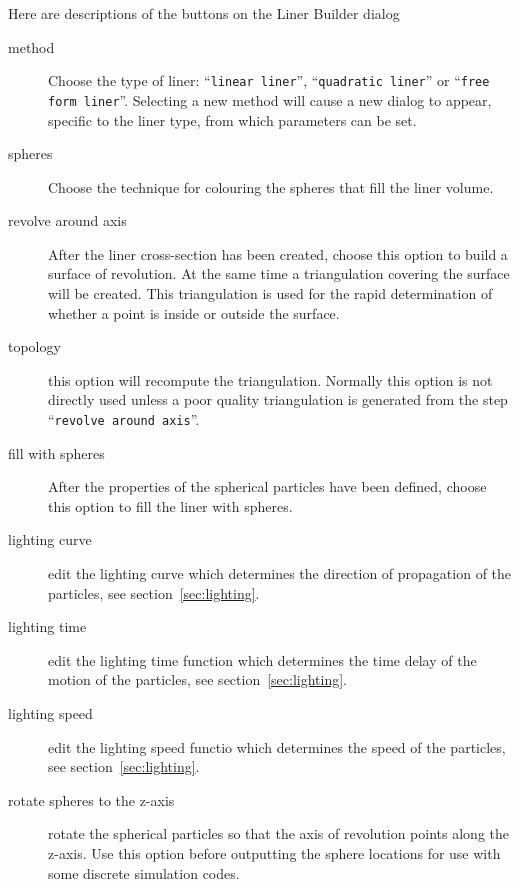 \documentclass[12pt]{article}
\newcommand{\cmd}[1]{``{\tt #1}''}
\begin{document}
Here are descriptions of the buttons on the Liner Builder dialog
\begin{description}
  \item[method] Choose the type of liner: \cmd{linear liner}, \cmd{quadratic liner} or \cmd{free form liner}.
     Selecting a new method will cause a new dialog to appear, specific to the liner type,
     from which parameters can be set.
  \item[spheres] Choose the technique for colouring the spheres that fill the liner volume. 
  \item[revolve around axis] After the liner cross-section has been created, choose this option
    to build a surface of revolution. At the same time a triangulation covering the surface
    will be created. This triangulation is used for the rapid determination of whether a 
    point is inside or outside the surface.
  \item[topology] this option will recompute the triangulation. Normally this option is
     not directly used unless a poor quality triangulation is generated from the step 
    \cmd{revolve around axis}.
  \item[fill with spheres] After the properties of the spherical particles have been 
    defined, choose this option to fill the liner with spheres.
  \item[lighting curve] edit the lighting curve which determines the direction of propagation
     of the particles, see section~\ref{sec:lighting}.
  \item[lighting time] edit the lighting time function which determines the time delay of the
    motion of the particles, see section~\ref{sec:lighting}.
  \item[lighting speed] edit the lighting speed functio which determines the speed of the 
    particles, see section~\ref{sec:lighting}.
  \item[rotate spheres to the z-axis] rotate the spherical particles so that the axis
    of revolution points along the z-axis. Use this option before outputting the sphere locations for
    use with some discrete simulation codes.
\end{description}
\end{document}
